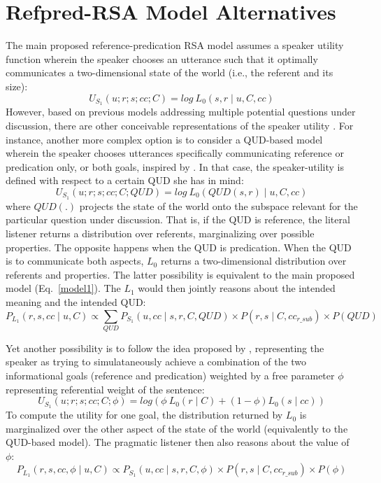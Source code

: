 \section{Refpred-RSA Model Alternatives}
The main proposed reference-predication RSA model assumes a speaker utility function wherein the speaker chooses an utterance such that it optimally communicates a two-dimensional state of the world (i.e., the referent and its size):
\begin{equation*}
U_{S_1} (u; r; s; cc; C) = log \: L_0 (s, r \mid u, C, cc) 
\end{equation*}
However, based on previous models addressing multiple potential questions under discussion, there are other conceivable representations of the speaker utility \parencite[cf.][]{kao2014nonliteral, yoon2016talking}. For instance, another more complex option is to consider a QUD-based model wherein the speaker chooses utterances specifically communicating reference or predication only, or both goals, inspired by \textcite{kao2014nonliteral}. In that case, the speaker-utility is defined with respect to a certain QUD she has in mind: 
\begin{equation*}
U_{S_1} (u; r; s; cc; C; QUD) = log \: L_0(QUD(s, r) \mid u, C, cc)
\end{equation*} 
where $QUD(.)$ projects the state of the world onto the subspace relevant for the particular question under discussion. That is, if the QUD is reference, the literal listener returns a distribution over referents, marginalizing over possible properties. The opposite happens when the QUD is predication. When the QUD is to communicate both aspects, $L_0$ returns a two-dimensional distribution over referents and properties. The latter possibility is equivalent to the main proposed model (Eq.~\ref{model1}). The $L_1$ would then jointly reasons about the intended meaning and the intended QUD: 
\begin{equation*}
P_{L_1} (r, s, cc \mid u, C) \propto \sum_{QUD} P_{S_1} (u, cc \mid s, r, C, QUD) \times P(r, s \mid C, cc_{r\_sub}) \times P(QUD)
\end{equation*} 

Yet another possibility is to follow the idea proposed by \textcite{yoon2016talking}, representing the speaker as trying to simulataneously achieve a combination of the two informational goals (reference and predication) weighted by a free parameter $\phi$ representing referential weight of the sentence:
\begin{equation*}
U_{S_1} (u; r; s; cc; C; \phi) = log(\phi \: L_0(r \mid C) + (1 - \phi) L_0(s \mid cc))
\end{equation*} 
To compute the utility for one goal, the distribution returned by $L_0$ is marginalized over the other aspect of the state of the world (equivalently to the QUD-based model). The pragmatic listener then also reasons about the value of $\phi$:
\begin{equation*}
P_{L_1} (r, s, cc, \phi \mid u, C) \propto P_{S_1} (u, cc \mid s, r, C, \phi) \times P(r, s \mid C, cc_{r\_sub}) \times P(\phi)
\end{equation*} 

